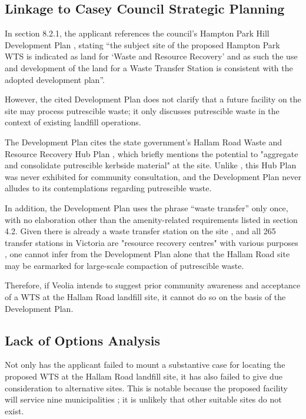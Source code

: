 \documentclass[12pt]{article}
\begin{document}
\subsection{Linkage to Casey Council Strategic Planning}

In section 8.2.1, the applicant references the council’s Hampton Park Hill Development Plan \cite{caseyhph}, stating “the subject site of the proposed Hampton Park WTS is indicated as land for ‘Waste and Resource Recovery’ and as such the use and development of the land for a Waste Transfer Station is consistent with the adopted development plan”.

However, the cited Development Plan does not clarify that a future facility on the site may process putrescible waste; it only discusses putrescible waste in the context of existing landfill operations. 

The Development Plan cites the state government's Hallam Road Waste and Resource Recovery Hub Plan \cite{hubplan}, which briefly mentions the potential to "aggregate and consolidate putrescible kerbside material" at the site. Unlike \cite{caseyhph}, this Hub Plan was never exhibited for community consultation, and the Development Plan never alludes to its contemplations regarding putrescible waste. 

In addition, the Development Plan uses the phrase “waste transfer” only once, with no elaboration other than the amenity-related requirements listed in section 4.2. Given there is already a waste transfer station on the site \cite{outlook}, and all 265 transfer stations in Victoria are "resource recovery centres" with various purposes \cite{vicwastemap}, one cannot infer from the Development Plan alone that the Hallam Road site may be earmarked for large-scale compaction of putrescible waste.  

Therefore, if Veolia intends to suggest prior community awareness and acceptance of a WTS at the Hallam Road landfill site, it cannot do so on the basis of the Development Plan.
 
\subsection{Lack of Options Analysis}

Not only has the applicant failed to mount a substantive case for locating the proposed WTS at the Hallam Road landfill site, it has also failed to give due consideration to alternative sites. This is notable because the proposed facility will service nine municipalities \cite{semawp}; it is unlikely that other suitable sites do not exist.
\end{document}
